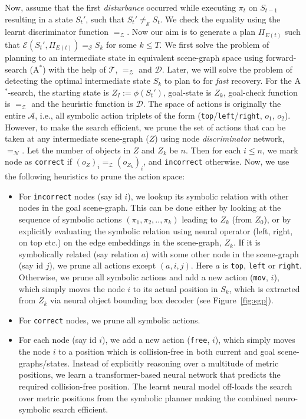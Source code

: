 Now, assume that the first \textit{disturbance} occurred while executing $\pi_t$ on $S_{t - 1}$ resulting in a state $S_t'$, such that $S_t' \neq_\mathcal{S} S_t$. We check the equality using the learnt discriminator function $=_\mathcal{Z}$. Now our aim is to generate a plan $\Pi_{E(t)}$ such that $\mathcal{E}(S_t', \Pi_{E(t)}) =_\mathcal{S} S_k$ for some $k \leq T$. We first solve the problem of planning to an intermediate state in equivalent scene-graph space using forward-search (A$^*$) with the help of $\mathcal{T}$, $=_\mathcal{Z}$ and $\mathcal{D}$. Later, we will solve the problem of detecting the optimal intermediate state $S_k$ to plan to for \textit{fast} recovery. For the A$^*$-search, the starting state is $Z_I := \phi(S_t')$, goal-state is $Z_k$, goal-check function is $=_\mathcal{Z}$ and the heuristic function is $\mathcal{D}$. The space of actions is originally the entire $\mathcal{A}$, i.e., all symbolic action triplets of the form (\texttt{top}/\texttt{left}/\texttt{right}, $o_1$, $o_2$). However, to make the search efficient, we prune the set of actions that can be taken at any intermediate scene-graph ($Z$) using node \textit{discriminator} network, $=_\mathcal{N}$. Let the number of objects in $Z$ and $Z_k$ be $n$. Then for each $i \leq n$, we mark node as \texttt{correct} if $(o_{Z})_i =_\mathcal{Z} (o_{Z_k})_i$, and \texttt{incorrect} otherwise. Now, we use the following heuristics to prune the action space:
\vspace{-0.7em}
\begin{itemize}
    \setlength\itemsep{-0.2em}
    \item For \texttt{incorrect} nodes (say id $i$), we lookup its symbolic relation with other nodes in the goal scene-graph. This can be done either by looking at the sequence of symbolic actions $(\pi_1, \pi_2, .., \pi_k)$ leading to $Z_k$ (from $Z_0$), or by explicitly evaluating the symbolic relation using neural operator (left, right, on top etc.) on the edge embeddings in the scene-graph, $Z_k$. If it is symbolically related (say relation $a$) with some other node in the scene-graph (say id $j$), we prune all actions except $(a, i, j)$. Here $a$ is \texttt{top}, \texttt{left} or \texttt{right}. Otherwise, we prune all symbolic actions and add a new action (\texttt{mov}, $i$), which simply moves the node $i$ to its actual position in $S_k$, which is extracted from $Z_k$ via neural object bounding box decoder (see Figure~\ref{fig:sgp}).
    \item For \texttt{correct} nodes, we prune all symbolic actions.
    \item For each node (say id $i$), we add a new action (\texttt{free}, $i$), which simply moves the node $i$ to a position which is collision-free in both current and goal scene-graphs/states. Instead of explicitly reasoning over a multitude of metric positions, we learn a transformer-based neural network that predicts the required collision-free position. The learnt neural model off-loads the search over metric positions from the symbolic planner making the combined neuro-symbolic search efficient.
\end{itemize}
